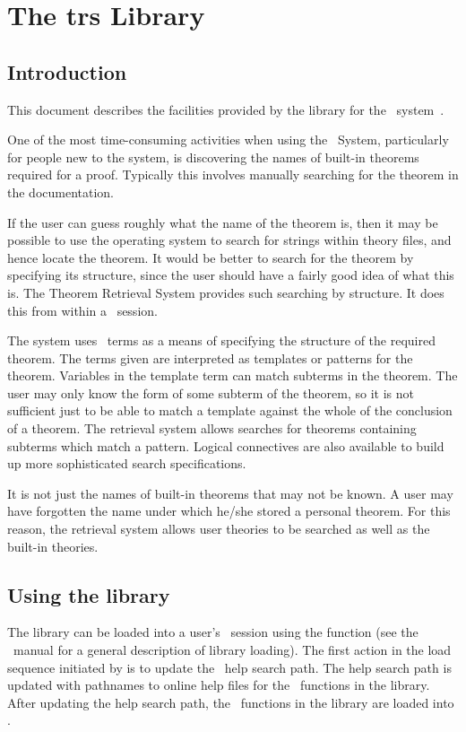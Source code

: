 \chapter{The trs Library}

\section{Introduction}

This document describes the facilities provided by the  library
for the \HOL\ system~\cite{description}.

One of the most time-consuming activities when using the \HOL\ System,
particularly for people new to the system, is discovering the names of
built-in theorems required for a proof. Typically this involves manually
searching for the theorem in the documentation.

If the user can guess roughly what the name of the theorem is, then it may be
possible to use the operating system to search for strings within theory
files, and hence locate the theorem. It would be better to search for the
theorem by specifying its structure, since the user should have a fairly good
idea of what this is. The Theorem Retrieval System provides such searching by
structure. It does this from within a \HOL\ session.

The system uses \HOL\ terms as a means of specifying the structure of the
required theorem. The terms given are interpreted as templates or patterns
for the theorem. Variables in the template term can match subterms in the
theorem. The user may only know the form of some subterm of the theorem, so
it is not sufficient just to be able to match a template against the whole of
the conclusion of a theorem. The retrieval system allows searches for theorems
containing subterms which match a pattern. Logical connectives are also
available to build up more sophisticated search specifications.

It is not just the names of built-in theorems that may not be known. A user
may have forgotten the name under which he/she stored a personal theorem.
For this reason, the retrieval system allows user theories to be searched
as well as the built-in theories.


\section{Using the library}

The  library can be loaded into a user's \HOL\ session using the
function  (see the
\HOL\ manual for a general description of library loading). The first action
in the load sequence initiated by  is to update the \HOL\
help search path. The help search path is
updated with pathnames to online help files for the \ML\ functions in the
library. After updating the help search path, the \ML\ functions in the
library are loaded into \HOL.

